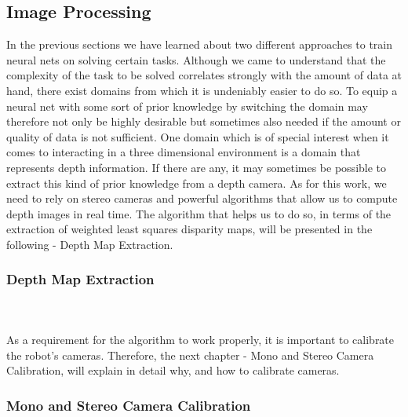 \subsection{Image Processing}
In the previous sections we have learned about two different approaches to train neural nets on solving certain tasks. Although we came to understand that the complexity of the task to be solved correlates strongly with the amount of data at hand, there exist domains from which it is undeniably easier to do so. To equip a neural net with some sort of prior knowledge by switching the domain may therefore not only be highly desirable but sometimes also needed if the amount or quality of data is not sufficient. One domain which is of special interest when it comes to interacting in a three dimensional environment is a domain that represents depth information. If there are any, it may sometimes be possible to extract this kind of prior knowledge from a depth camera. As for this work, we need to rely on stereo cameras and powerful algorithms that allow us to compute depth images in real time. The algorithm that helps us to do so, in terms of the extraction of weighted least squares disparity maps, will be presented in the following - Depth Map Extraction.
\subsubsection{Depth Map Extraction}

\\\\
As a requirement for the algorithm to work properly, it is important to calibrate the robot's cameras. Therefore, the next chapter - Mono and Stereo Camera Calibration, will explain in detail why, and how to calibrate cameras.
\subsubsection{Mono and Stereo Camera Calibration}
